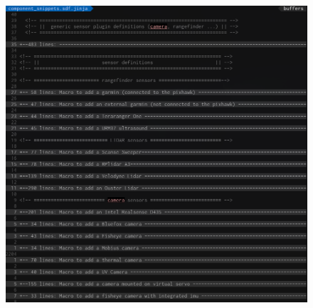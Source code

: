\documentclass[aspectratio=169]{beamer}
\begin{document}
\begin{frame}
\begin{columns}[c]
{      \begin{figure}
        \includegraphics[width=1.0\textwidth]{./fig/component_snippets.png}
      \end{figure}
    }



\end{columns}
\end{frame}
\end{document}
